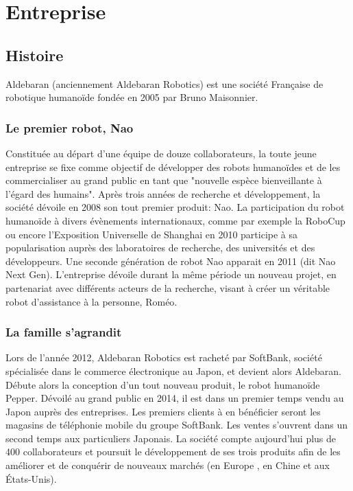 \chapter{Entreprise}
\label{Entreprise}
\thispagestyle{fancy}

\section{Histoire}
\label{Entreprise: histoire}
Aldebaran (anciennement Aldebaran Robotics) est une société Française de robotique humanoïde fondée en 2005 par Bruno Maisonnier. 

\subsection{Le premier robot, Nao}
\label{Entreprise:Histoire:Nao}
Constituée au départ d'une équipe de douze collaborateurs, la toute jeune entreprise se fixe comme objectif de développer des robots humanoïdes et de les commercialiser au grand public en tant que "nouvelle espèce bienveillante à l'égard des humains". Après trois années de recherche et développement, la société dévoile en 2008 son tout premier produit: Nao. La participation du robot humanoïde à divers évènements internationaux, comme par exemple la RoboCup ou encore l'Exposition Universelle de Shanghai en 2010 participe à sa popularisation auprès des laboratoires de recherche, des universités et des développeurs. Une seconde génération de robot Nao apparait en 2011 (dit Nao Next Gen). L'entreprise dévoile durant la même période un nouveau projet, en partenariat avec différents acteurs de la recherche, visant à créer un véritable robot d'assistance à la personne, Roméo. 

\subsection{La famille s'agrandit}
\label{Entreprise: La famille Aldebaran}
Lors de l'année 2012, Aldebaran Robotics est racheté par SoftBank, société spécialisée dans le commerce électronique au Japon, et devient alors Aldebaran. Débute alors la conception d'un tout nouveau produit, le robot humanoïde Pepper. Dévoilé au grand public en 2014, il est dans un premier temps vendu au Japon auprès des entreprises. Les premiers clients à en bénéficier seront les magasins de téléphonie mobile du groupe SoftBank. Les ventes s'ouvrent dans un second temps aux particuliers Japonais. La société compte aujourd'hui plus de 400 collaborateurs et poursuit le développement de ses trois produits afin de les améliorer et de conquérir de nouveaux marchés (en Europe , en Chine et aux États-Unis).

